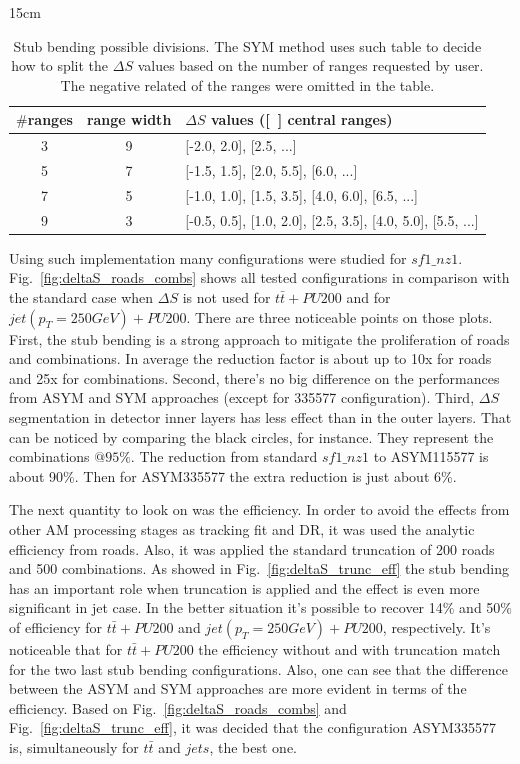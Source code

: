 \begin{table}[htbp]{15cm}
	\caption{Stub bending possible divisions. The SYM method uses such table to decide how to split the $\Delta S$ values based on the number of ranges requested by user. The negative related of the ranges were omitted in the table.}
	\centering
	\begin{tabular}{c|c|l}
		\hline
		\hline
		$\#$ranges & range width & $\Delta S$ values ({\color{red}[~]} central ranges)\\
		\hline
		3 & 9 & {\color{red}[}-2.0, 2.0{\color{red}]}, [2.5, ...]\\
		5 & 7 & {\color{red}[}-1.5, 1.5{\color{red}]}, [2.0, 5.5], [6.0, ...]\\
		7 & 5 & {\color{red}[}-1.0, 1.0{\color{red}]}, [1.5, 3.5], [4.0, 6.0], [6.5, ...]\\
		9 & 3 & {\color{red}[}-0.5, 0.5{\color{red}]}, [1.0, 2.0], [2.5, 3.5], [4.0, 5.0], [5.5, ...]\\
		\hline 
	\end{tabular}
	\label{tab:deltaS_divisions}
\end{table}

Using such implementation many configurations were studied for $sf1\_nz1$. Fig.~\ref{fig:deltaS_roads_combs} shows all tested configurations in comparison with the standard case when $\Delta S$ is not used for $t\bar{t}+PU200$ and for $jet(p_{T}=250GeV)+PU200$. There are three noticeable points on those plots. First, the stub bending is a strong approach to mitigate the proliferation of roads and combinations. In average the reduction factor is about up to 10x for roads and 25x for combinations. Second, there's no big difference on the performances from ASYM and SYM approaches (except for 335577 configuration). Third, $\Delta S$ segmentation in detector inner layers has less effect than in the outer layers. That can be noticed by comparing the black circles, for instance. They represent the combinations $@95\%$. The reduction from standard $sf1\_nz1$ to ASYM115577 is about 90$\%$. Then for ASYM335577 the extra reduction is just about 6$\%$.

The next quantity to look on was the efficiency. In order to avoid the effects from other AM processing stages as tracking fit and DR, it was used the analytic efficiency from roads. Also, it was applied the standard truncation of 200 roads and 500 combinations. As showed in Fig.~\ref{fig:deltaS_trunc_eff} the stub bending has an important role when truncation is applied and the effect is even more significant in jet case. In the better situation it's possible to recover 14$\%$ and 50$\%$ of efficiency for $t\bar{t}+PU200$ and $jet(p_{T}=250GeV)+PU200$, respectively. It's noticeable that for $t\bar{t}+PU200$ the efficiency without and with truncation match for the two last stub bending configurations. Also, one can see that the difference between the ASYM and SYM approaches are more evident in terms of the efficiency. Based on Fig.~\ref{fig:deltaS_roads_combs} and Fig.~\ref{fig:deltaS_trunc_eff}, it was decided that the configuration ASYM335577 is, simultaneously for $t\bar{t}$ and $jets$, the best one.

